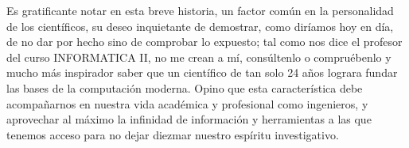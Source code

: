 \documentclass{article}
\begin{document}
\begin{multicols}{2}
        \vspace{\baselineskip}
        
        Es gratificante notar en esta breve historia, un factor común en la personalidad de los científicos, su deseo inquietante de demostrar, como diríamos hoy en día, de no dar por hecho sino de comprobar lo expuesto; tal como nos dice el profesor del curso INFORMATICA II, {no me crean a mí, consúltenlo o compruébenlo} y mucho más inspirador saber que un científico de tan solo 24 años lograra fundar las bases de la computación moderna.  Opino que esta característica debe acompañarnos en nuestra vida académica y profesional como ingenieros, y aprovechar al máximo la infinidad de información y herramientas a las que tenemos acceso para no dejar diezmar nuestro espíritu investigativo.
        
        \printbibliography
    
\end{multicols}
\end{document}
